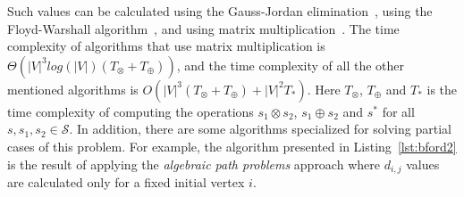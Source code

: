 Such values can be calculated using the Gauss-Jordan elimination~\cite{rote1985systolic, tarjan1981fast, tarjan1981unified}, using the Floyd-Warshall algorithm~\cite{fletcher1980more, floyd1962algorithm, warshall1962theorem}, and using matrix multiplication~\cite{aho1974design, cormen2009introduction}. The time complexity of algorithms that use matrix multiplication is $\Theta(|V|^3 log(|V|) (T_{\otimes} + T_{\oplus}))$, and the time complexity of all the other mentioned algorithms is $O(|V|^3(T_{\otimes} + T_{\oplus}) + |V|^2 T_*)$. Here $T_{\otimes}$, $T_{\oplus}$ and $T_*$ is the time complexity of computing the operations $s_1 \otimes s_2$, $s_1 \oplus s_2$ and $s^*$ for all $s, s_1, s_2 \in \mathcal{S}$. In addition, there are some algorithms specialized for solving partial cases of this problem. For example, the algorithm presented in Listing~\ref{lst:bford2} is the result of applying the \textit{algebraic path problems} approach where $d_{i,j}$ values are calculated only for a fixed initial vertex $i$.


